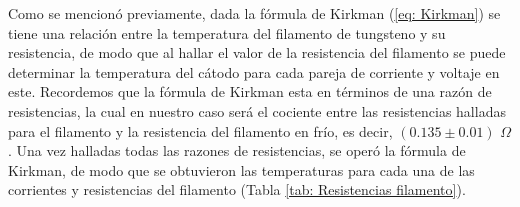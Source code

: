 \documentclass[%
 reprint,
 amsmath,amssymb,
 aps,
]{revtex4-2}
\begin{document}
Como se mencionó previamente, dada la fórmula de Kirkman (\ref{eq: Kirkman}) se tiene una relación entre la temperatura del filamento de tungsteno y su resistencia, de modo que al hallar el valor de la resistencia del filamento se puede determinar la temperatura del cátodo para cada pareja de corriente y voltaje en este. Recordemos que la fórmula de Kirkman esta en términos de una razón de resistencias, la cual en nuestro caso será el cociente entre las resistencias halladas para el filamento y la resistencia del filamento en frío, es decir, $(0.135 \pm 0.01)$ $\Omega$. Una vez halladas todas las razones de resistencias, se operó la fórmula de Kirkman, de modo que se obtuvieron las temperaturas para cada una de las corrientes y resistencias del filamento (Tabla \ref{tab: Resistencias filamento}).


\end{document}
